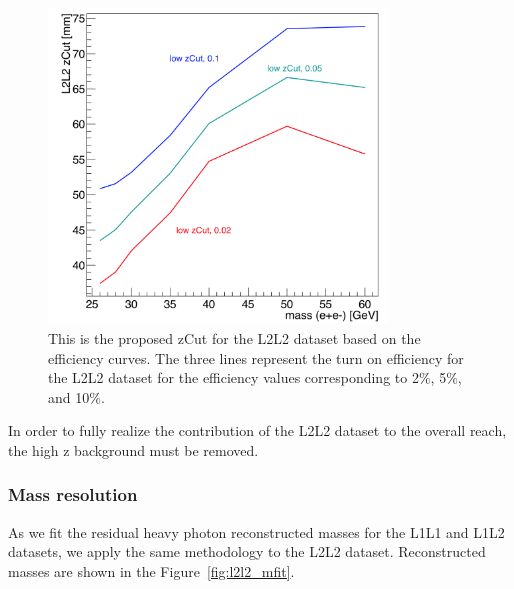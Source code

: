 \begin{figure}[H]
  \centering
     \includegraphics[width=0.8\textwidth]{plots/L2L2_proposedZcut.png}
  \caption{This is the proposed zCut for the L2L2 dataset based on the efficiency curves. The three lines represent the turn on efficiency for the L2L2 dataset for the efficiency values corresponding to 2$\%$, 5$\%$, and 10$\%$.}
  \label{fig:proposedZ_L2L2}
\end{figure} 

In order to fully realize the contribution of the L2L2 dataset to the overall reach, the high z background must be removed. 

\subsubsection{Mass resolution}

As we fit the residual heavy photon reconstructed masses for the L1L1 and L1L2 datasets, we apply the same methodology to the L2L2 dataset. Reconstructed masses are shown in the Figure~\ref{fig:l2l2_mfit}.


